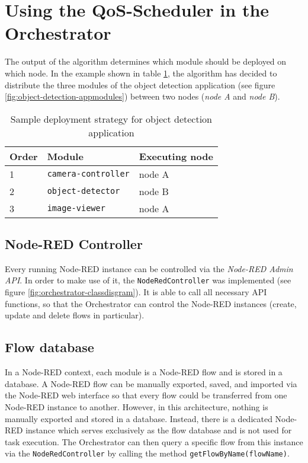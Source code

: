 \section{Using the QoS-Scheduler in the Orchestrator}

The output of the algorithm determines which module should be deployed on which node.
In the example shown in table \ref{tab:deployment-strategy-example}, the algorithm has decided to distribute the three modules of the object detection application (see figure \ref{fig:object-detection-appmodules}) between two nodes (\textit{node A} and \textit{node B}).

\begin{table}[htb]
    \centering
    \begin{tabular}{|m{1.5cm}|m{4cm}|m{3.5cm}|}
        \hline
        \textbf{Order} & \textbf{Module} & \textbf{Executing node}\\
        \hline
        1 & \texttt{camera-controller} & node A\\
        \hline
        2 & \texttt{object-detector} & node B\\
        \hline
        3 & \texttt{image-viewer} & node A\\
        \hline
    \end{tabular}
    \caption{Sample deployment strategy for object detection application}
    \label{tab:deployment-strategy-example}
\end{table}

\subsection*{Node-RED Controller}

Every running Node-RED instance can be controlled via the \textit{Node-RED Admin API}. In order to make use of it, the \texttt{NodeRedController} was implemented (see figure \ref{fig:orchestrator-classdisgram}). It is able to call all necessary API functions, so that the Orchestrator can control the Node-RED instances (create, update and delete flows in particular).

\subsection*{Flow database}
In a Node-RED context, each module is a Node-RED flow and is stored in a database.
A Node-RED flow can be manually exported, saved, and imported via the Node-RED web interface so that every flow could be transferred from one Node-RED instance to another.
However, in this architecture, nothing is manually exported and stored in a database.
Instead, there is a dedicated Node-RED instance which serves exclusively as the flow database and is not used for task execution.
The Orchestrator can then query a specific flow from this instance via the \texttt{NodeRedController} by calling the method \texttt{getFlowByName(flowName)}.

